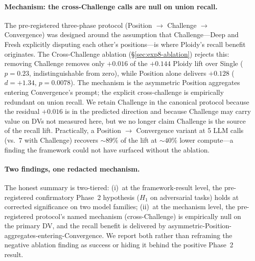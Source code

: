 \documentclass[11pt]{article}
\begin{document}
\paragraph{Mechanism: the cross-Challenge calls are null on union recall.} The pre-registered three-phase protocol (Position $\to$ Challenge $\to$ Convergence) was designed around the assumption that Challenge---Deep and Fresh explicitly disputing each other's positions---is where Ploidy's recall benefit originates. The Cross-Challenge ablation (\S\ref{sec:exp8-ablation}) rejects this: removing Challenge removes only $+0.016$ of the $+0.144$ Ploidy lift over Single ($p = 0.23$, indistinguishable from zero), while Position alone delivers $+0.128$ ($d = +1.34$, $p = 0.0078$). The mechanism is the asymmetric Position aggregates entering Convergence's prompt; the explicit cross-challenge is empirically redundant on union recall. We retain Challenge in the canonical protocol because the residual $+0.016$ is in the predicted direction and because Challenge may carry value on DVs not measured here, but we no longer claim Challenge is the source of the recall lift. Practically, a Position $\to$ Convergence variant at 5 LLM calls (vs.\ 7 with Challenge) recovers $\sim 89\%$ of the lift at $\sim 40\%$ lower compute---a finding the framework could not have surfaced without the ablation.

\paragraph{Two findings, one redacted mechanism.} The honest summary is two-tiered: (i)~at the framework-result level, the pre-registered confirmatory Phase~2 hypothesis ($H_1$ on adversarial tasks) holds at corrected significance on two model families; (ii)~at the mechanism level, the pre-registered protocol's named mechanism (cross-Challenge) is empirically null on the primary DV, and the recall benefit is delivered by asymmetric-Position-aggregates-entering-Convergence. We report both rather than reframing the negative ablation finding as success or hiding it behind the positive Phase~2 result.
\end{document}
